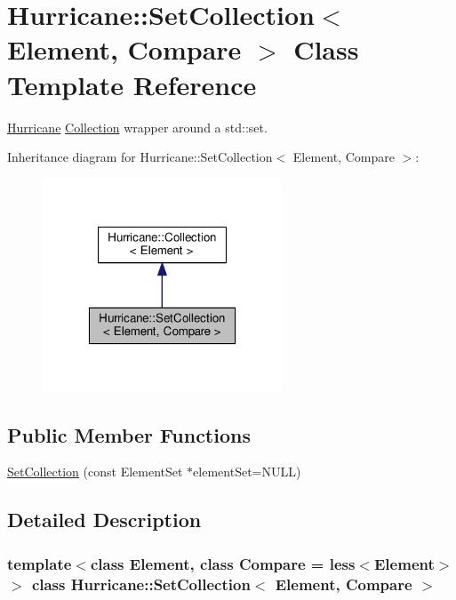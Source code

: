 \hypertarget{classHurricane_1_1SetCollection}{}\section{Hurricane\+:\+:Set\+Collection$<$ Element, Compare $>$ Class Template Reference}
\label{classHurricane_1_1SetCollection}


\mbox{\hyperlink{namespaceHurricane}{Hurricane}} \mbox{\hyperlink{classHurricane_1_1Collection}{Collection}} wrapper around a std\+::set.  




Inheritance diagram for Hurricane\+:\+:Set\+Collection$<$ Element, Compare $>$\+:\nopagebreak
\begin{figure}[H]
\begin{center}
\leavevmode
\includegraphics[width=202pt]{classHurricane_1_1SetCollection__inherit__graph}
\end{center}
\end{figure}
\subsection*{Public Member Functions}
\begin{DoxyCompactItemize}
\item 
\mbox{\hyperlink{classHurricane_1_1SetCollection_a3ee200fd00f3a6951906209c11c03e34}{Set\+Collection}} (const Element\+Set $\ast$element\+Set=N\+U\+LL)
\end{DoxyCompactItemize}


\subsection{Detailed Description}
\subsubsection*{template$<$class Element, class Compare = less$<$\+Element$>$$>$\newline
class Hurricane\+::\+Set\+Collection$<$ Element, Compare $>$}

